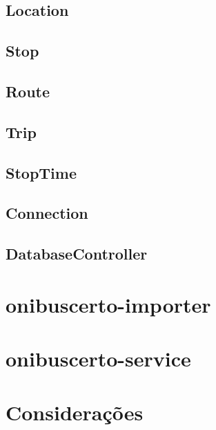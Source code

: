 
\subsection{Location}

\subsection{Stop}

\subsection{Route}

\subsection{Trip}

\subsection{StopTime}

\subsection{Connection}

\subsection{DatabaseController}


\section{onibuscerto-importer}

\section{onibuscerto-service}

\section{Considerações}